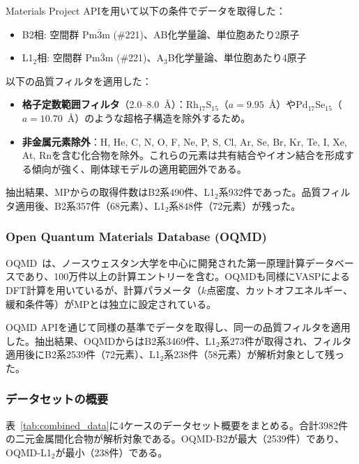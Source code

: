 \documentclass[a4paper,10pt,5p]{elsarticle}
\begin{document}
Materials Project APIを用いて以下の条件でデータを取得した：
\begin{itemize}
\setlength{\parskip}{0cm}
\setlength{\itemsep}{0cm}
    \item B2相: 空間群 Pm$\bar{3}$m (\#221)、AB化学量論、単位胞あたり2原子
    \item L1$_2$相: 空間群 Pm$\bar{3}$m (\#221)、A$_3$B化学量論、単位胞あたり4原子
\end{itemize}

以下の品質フィルタを適用した：
\begin{itemize}
\setlength{\parskip}{0cm}
\setlength{\itemsep}{0cm}
    \item \textbf{格子定数範囲フィルタ}（2.0--8.0~\AA）：Rh$_{17}$S$_{15}$（$a = 9.95$~\AA）やPd$_{17}$Se$_{15}$（$a = 10.70$~\AA）のような超格子構造を除外するため。
    \item \textbf{非金属元素除外}：H, He, C, N, O, F, Ne, P, S, Cl, Ar, Se, Br, Kr, Te, I, Xe, At, Rnを含む化合物を除外。これらの元素は共有結合やイオン結合を形成する傾向が強く、剛体球モデルの適用範囲外である。
\end{itemize}

抽出結果、MPからの取得件数はB2系490件、L1$_2$系932件であった。品質フィルタ適用後、B2系357件（68元素）、L1$_2$系848件（72元素）が残った。

\subsubsection{Open Quantum Materials Database (OQMD)}
OQMD~\cite{saal2013}は、ノースウェスタン大学を中心に開発された第一原理計算データベースであり、100万件以上の計算エントリーを含む。OQMDも同様にVASPによるDFT計算を用いているが、計算パラメータ（$k$点密度、カットオフエネルギー、緩和条件等）がMPとは独立に設定されている。

OQMD APIを通じて同様の基準でデータを取得し、同一の品質フィルタを適用した。抽出結果、OQMDからはB2系3469件、L1$_2$系273件が取得され、フィルタ適用後にB2系2539件（72元素）、L1$_2$系238件（58元素）が解析対象として残った。

\subsubsection{データセットの概要}
表~\ref{tab:combined_data}に4ケースのデータセット概要をまとめる。合計3982件の二元金属間化合物が解析対象である。OQMD-B2が最大（2539件）であり、OQMD-L1$_2$が最小（238件）である。
\end{document}

